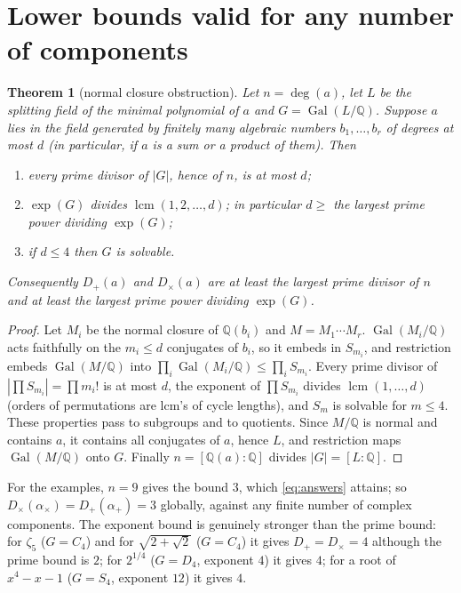 \documentclass[11pt,a4paper]{article}
\newtheorem{theorem}{Theorem}[section]
\theoremstyle{definition}
\theoremstyle{remark}
\newcommand{\Q}{\mathbb{Q}}
\newcommand{\Gal}{\operatorname{Gal}}
\newcommand{\lcm}{\operatorname{lcm}}
\newcommand{\dg}{\deg}
\newcommand{\Dp}{D_{+}}
\newcommand{\Dt}{D_{\times}}
\begin{document}
\section{Lower bounds valid for any number of components}\label{sec:bounds}

\begin{theorem}[normal closure obstruction]\label{thm:bound}
Let $n=\dg(a)$, let $L$ be the splitting field of the minimal polynomial of $a$ and $G=\Gal(L/\Q)$.
Suppose $a$ lies in the field generated by finitely many algebraic numbers $b_1,\dots,b_r$ of degrees at
most $d$ (in particular, if $a$ is a sum or a product of them).  Then
\begin{enumerate}[label=(\roman*)]
\item every prime divisor of $|G|$, hence of $n$, is at most $d$;
\item $\exp(G)$ divides $\lcm(1,2,\dots,d)$; in particular $d\ge$ the largest prime power dividing $\exp(G)$;
\item if $d\le4$ then $G$ is solvable.
\end{enumerate}
Consequently $\Dp(a)$ and $\Dt(a)$ are at least the largest prime divisor of $n$ and at least the
largest prime power dividing $\exp(G)$.
\end{theorem}

\begin{proof}
Let $M_i$ be the normal closure of $\Q(b_i)$ and $M=M_1\cdots M_r$.  $\Gal(M_i/\Q)$ acts faithfully on
the $m_i\le d$ conjugates of $b_i$, so it embeds in $S_{m_i}$, and restriction embeds $\Gal(M/\Q)$ into
$\prod_i\Gal(M_i/\Q)\le\prod_iS_{m_i}$.  Every prime divisor of $|\prod S_{m_i}|=\prod m_i!$ is at most
$d$, the exponent of $\prod S_{m_i}$ divides $\lcm(1,\dots,d)$ (orders of permutations are lcm's of cycle
lengths), and $S_{m}$ is solvable for $m\le4$.  These properties pass to subgroups and to quotients.
Since $M/\Q$ is normal and contains $a$, it contains all conjugates of $a$, hence $L$, and restriction
maps $\Gal(M/\Q)$ onto $G$.  Finally $n=[\Q(a):\Q]$ divides $|G|=[L:\Q]$.
\end{proof}

For the examples, $n=9$ gives the bound $3$, which \eqref{eq:answers} attains; so
$\Dt(\alpha_\times)=\Dp(\alpha_+)=3$ globally, against any finite number of complex components.  The
exponent bound is genuinely stronger than the prime bound: for $\zeta_5$ ($G=C_4$) and for
$\sqrt{2+\sqrt2}$ ($G=C_4$) it gives $\Dp=\Dt=4$ although the prime bound is $2$; for $2^{1/4}$
($G=D_4$, exponent $4$) it gives $4$; for a root of $x^4-x-1$ ($G=S_4$, exponent $12$) it gives $4$.
\end{document}
